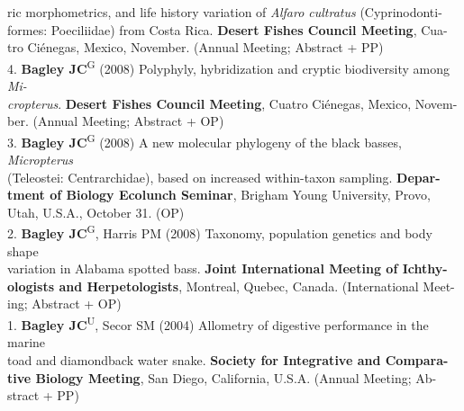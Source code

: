 \documentclass[margin,line]{res}
\begin{document}
\begin{resume}
\hspace*{8mm} ric morphometrics, and life history variation of \emph{Alfaro cultratus} (Cyprinodonti-\\
\hspace*{8mm} formes: Poeciliidae) from Costa Rica. \textbf{Desert Fishes Council Meeting}, Cua-\\ \vspace{2mm}
\hspace*{8mm}tro Ci\'{e}negas, Mexico, November. (Annual Meeting; Abstract + PP) \\
4. \textbf{Bagley JC}\textsuperscript{G} (2008) Polyphyly, hybridization and cryptic biodiversity among \emph{Mi-}\\
\hspace*{8mm} \emph{cropterus}. \textbf{Desert Fishes Council Meeting}, Cuatro Ci\'{e}negas, Mexico, Novem-\\ \vspace{2mm}
\hspace*{8mm}ber. (Annual Meeting; Abstract + OP) \\
3. \textbf{Bagley JC}\textsuperscript{G} (2008) A new molecular phylogeny of the black basses, \emph{Micropterus}\\
\hspace*{8mm} (Teleostei: Centrarchidae), based on increased within-taxon sampling. \textbf{Depar-}\\
\hspace*{8mm} \textbf{tment of Biology Ecolunch Seminar}, Brigham Young University, Provo,\\ \vspace{2mm}
\hspace*{8mm}Utah, U.S.A., October 31. (OP) \\
2. \textbf{Bagley JC}\textsuperscript{G}, Harris PM (2008) Taxonomy, population genetics and body shape\\
\hspace*{8mm} variation in Alabama spotted bass. \textbf{Joint International Meeting of Ichthy-}\\
\hspace*{8mm} \textbf{ologists and Herpetologists}, Montreal, Quebec, Canada. (International Meet-\\ \vspace{2mm}
\hspace*{8mm}ing; Abstract + OP) \\
1. \textbf{Bagley JC}\textsuperscript{U}, Secor SM (2004) Allometry of digestive performance in the marine\\
\hspace*{8mm} toad and diamondback water snake. \textbf{Society for Integrative and Compara-}\\
\hspace*{8mm} \textbf{tive Biology Meeting}, San Diego, California, U.S.A. (Annual Meeting; Ab- \\ \vspace{2mm}
\hspace*{8mm}stract + PP)




\end{resume}
\end{document}
